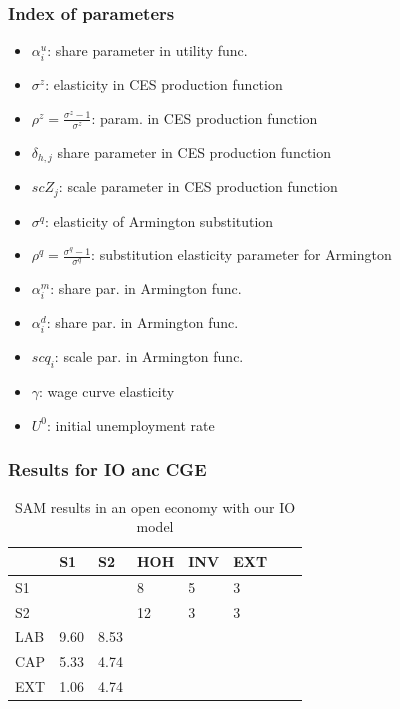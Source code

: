 \subsubsection{Index of parameters}
\begin{itemize}
	\item $\alpha^u_i$: share parameter in utility func.
	\item $\sigma^z$: elasticity in CES production function
	\item $\rho^z = \frac{\sigma^z - 1}{\sigma^z}$: param. in CES production function
	\item $\delta_{h,j}$ share parameter in CES production function
	\item $scZ_j$: scale parameter in CES production function  
	\item $\sigma^q$: elasticity of Armington substitution
	\item $\rho^q = \frac{\sigma^q-1}{\sigma^q}$: substitution elasticity parameter for Armington
	\item $\alpha^m_i$: share par. in Armington func.
	\item $\alpha^d_i$: share par. in Armington func.
	\item $scq_i$: scale par. in Armington func.
	\item $\gamma$: wage curve elasticity
	\item $U^0$: initial unemployment rate
\end{itemize}


\subsubsection{Results for IO anc CGE}
\label{subsec:open_economy_results}

\begin{table}[!h]
	\centering
	\caption{SAM results in an open economy with our IO model}
	\label{tab:SAM_IO_openEconomy}
	\begin{tabular}{llllllll}
		\toprule
		& S1 & S2 &  HOH & INV & EXT \\
		\midrule
		S1 &  &   & 8 & 5 & 3 \\
		S2 &  &    & 12 & 3 & 3 \\
		LAB & 9.60 & 8.53 &   &  &  \\
		CAP & 5.33 & 4.74 &   &  &  \\
		EXT & 1.06 & 4.74 &   &  &  \\
		\bottomrule
	\end{tabular}
\end{table}


